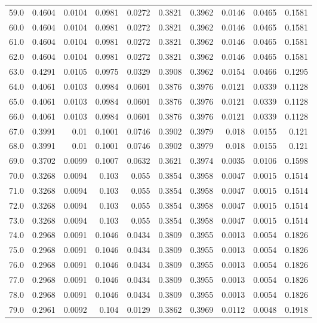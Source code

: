 \begin{longtable}{lrrrrrrrrr}
59.0 & 0.4604 & 0.0104 & 0.0981 & 0.0272 & 0.3821 & 0.3962 & 0.0146 & 0.0465 & 0.1581 \\
60.0 & 0.4604 & 0.0104 & 0.0981 & 0.0272 & 0.3821 & 0.3962 & 0.0146 & 0.0465 & 0.1581 \\
61.0 & 0.4604 & 0.0104 & 0.0981 & 0.0272 & 0.3821 & 0.3962 & 0.0146 & 0.0465 & 0.1581 \\
62.0 & 0.4604 & 0.0104 & 0.0981 & 0.0272 & 0.3821 & 0.3962 & 0.0146 & 0.0465 & 0.1581 \\
63.0 & 0.4291 & 0.0105 & 0.0975 & 0.0329 & 0.3908 & 0.3962 & 0.0154 & 0.0466 & 0.1295 \\
64.0 & 0.4061 & 0.0103 & 0.0984 & 0.0601 & 0.3876 & 0.3976 & 0.0121 & 0.0339 & 0.1128 \\
65.0 & 0.4061 & 0.0103 & 0.0984 & 0.0601 & 0.3876 & 0.3976 & 0.0121 & 0.0339 & 0.1128 \\
66.0 & 0.4061 & 0.0103 & 0.0984 & 0.0601 & 0.3876 & 0.3976 & 0.0121 & 0.0339 & 0.1128 \\
67.0 & 0.3991 & 0.01 & 0.1001 & 0.0746 & 0.3902 & 0.3979 & 0.018 & 0.0155 & 0.121 \\
68.0 & 0.3991 & 0.01 & 0.1001 & 0.0746 & 0.3902 & 0.3979 & 0.018 & 0.0155 & 0.121 \\
69.0 & 0.3702 & 0.0099 & 0.1007 & 0.0632 & 0.3621 & 0.3974 & 0.0035 & 0.0106 & 0.1598 \\
70.0 & 0.3268 & 0.0094 & 0.103 & 0.055 & 0.3854 & 0.3958 & 0.0047 & 0.0015 & 0.1514 \\
71.0 & 0.3268 & 0.0094 & 0.103 & 0.055 & 0.3854 & 0.3958 & 0.0047 & 0.0015 & 0.1514 \\
72.0 & 0.3268 & 0.0094 & 0.103 & 0.055 & 0.3854 & 0.3958 & 0.0047 & 0.0015 & 0.1514 \\
73.0 & 0.3268 & 0.0094 & 0.103 & 0.055 & 0.3854 & 0.3958 & 0.0047 & 0.0015 & 0.1514 \\
74.0 & 0.2968 & 0.0091 & 0.1046 & 0.0434 & 0.3809 & 0.3955 & 0.0013 & 0.0054 & 0.1826 \\
75.0 & 0.2968 & 0.0091 & 0.1046 & 0.0434 & 0.3809 & 0.3955 & 0.0013 & 0.0054 & 0.1826 \\
76.0 & 0.2968 & 0.0091 & 0.1046 & 0.0434 & 0.3809 & 0.3955 & 0.0013 & 0.0054 & 0.1826 \\
77.0 & 0.2968 & 0.0091 & 0.1046 & 0.0434 & 0.3809 & 0.3955 & 0.0013 & 0.0054 & 0.1826 \\
78.0 & 0.2968 & 0.0091 & 0.1046 & 0.0434 & 0.3809 & 0.3955 & 0.0013 & 0.0054 & 0.1826 \\
79.0 & 0.2961 & 0.0092 & 0.104 & 0.0129 & 0.3862 & 0.3969 & 0.0112 & 0.0048 & 0.1918 \\

\end{longtable}
